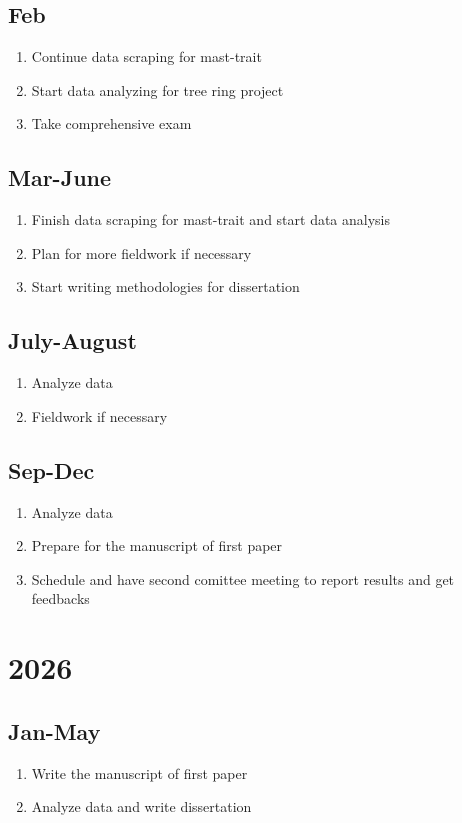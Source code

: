 \documentclass[12pt,letter]{article}
\begin{document}
\subsection{Feb}
\begin{enumerate}
	\item Continue data scraping for mast-trait
	\item Start data analyzing for tree ring project
	\item Take comprehensive exam
	\end{enumerate}	
\subsection{Mar-June}
\begin{enumerate}
	\item Finish data scraping for mast-trait and start data analysis
	\item Plan for more fieldwork if necessary
	\item Start writing methodologies for dissertation
	\end{enumerate}	
\subsection{July-August}
\begin{enumerate}
	\item Analyze data
	\item Fieldwork if necessary
	\end{enumerate}	
\subsection{Sep-Dec}
\begin{enumerate}
	\item Analyze data
	\item Prepare for the manuscript of first paper
	\item Schedule and have second comittee meeting to report results and get feedbacks
	\end{enumerate}	
\section{2026}
\subsection{Jan-May}
\begin{enumerate}
	\item Write the manuscript of first paper
	\item Analyze data and write dissertation
	\end{enumerate}	
\end{document}
